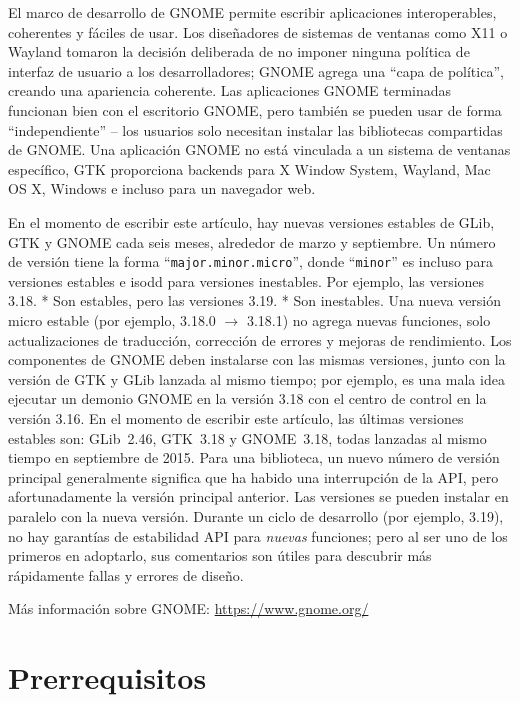 El marco de desarrollo de GNOME permite escribir aplicaciones interoperables, coherentes y fáciles de usar. Los diseñadores de sistemas de ventanas como X11 o Wayland tomaron la decisión deliberada de no imponer ninguna política de interfaz de usuario a los desarrolladores; GNOME agrega una ``capa de política'', creando una apariencia coherente. Las aplicaciones GNOME terminadas funcionan bien con el escritorio GNOME, pero también se pueden usar de forma ``independiente'' -- los usuarios solo necesitan instalar las bibliotecas compartidas de GNOME. Una aplicación GNOME no está vinculada a un sistema de ventanas específico, GTK proporciona backends para X Window System, Wayland, Mac OS X, Windows e incluso para un navegador web.

En el momento de escribir este artículo, hay nuevas versiones estables de GLib, GTK y GNOME cada seis meses, alrededor de marzo y septiembre. Un número de versión tiene la forma ``\texttt{major.minor.micro}'', donde ``\texttt{minor}'' es incluso para versiones estables e isodd para versiones inestables. Por ejemplo, las versiones 3.18. * Son estables, pero las versiones 3.19. * Son inestables. Una nueva versión micro estable (por ejemplo, 3.18.0 $\rightarrow$ 3.18.1) no agrega nuevas funciones, solo actualizaciones de traducción, corrección de errores y mejoras de rendimiento. Los componentes de GNOME deben instalarse con las mismas versiones, junto con la versión de GTK y GLib lanzada al mismo tiempo; por ejemplo, es una mala idea ejecutar un demonio GNOME en la versión 3.18 con el centro de control en la versión 3.16. En el momento de escribir este artículo, las últimas versiones estables son: GLib~2.46, GTK~3.18 y GNOME~3.18, todas lanzadas al mismo tiempo en septiembre de 2015. Para una biblioteca, un nuevo número de versión principal generalmente significa que ha habido una interrupción de la API, pero afortunadamente la versión principal anterior. Las versiones se pueden instalar en paralelo con la nueva versión. Durante un ciclo de desarrollo (por ejemplo, 3.19), no hay garantías de estabilidad API para \emph{nuevas} funciones; pero al ser uno de los primeros en adoptarlo, sus comentarios son útiles para descubrir más rápidamente fallas y errores de diseño.

Más información sobre GNOME: \url{https://www.gnome.org/}

\section{Prerrequisitos}

